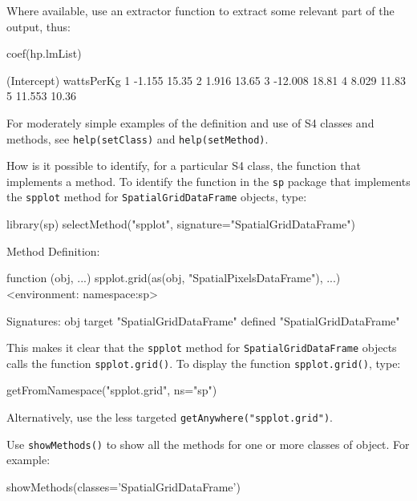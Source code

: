 \documentclass{tufte-book}\usepackage[]{graphicx}\usepackage[]{color}
\newcommand{\txtt}[1]{\texttt{#1}}
\begin{document}
Where available, use an extractor function to extract some relevant
part of the output, thus:
\begin{Schunk}
\begin{Sinput}
coef(hp.lmList)
\end{Sinput}
\begin{Soutput}
  (Intercept) wattsPerKg
1      -1.155      15.35
2       1.916      13.65
3     -12.008      18.81
4       8.029      11.83
5      11.553      10.36
\end{Soutput}
\end{Schunk}

For moderately simple examples of the definition and use of S4 classes
and methods, see \txtt{help(setClass)} and \txtt{help(setMethod)}.

How is it possible to identify, for a particular S4 class, the
function that implements a method.  To identify the function
in the \txtt{sp} package that implements the \txtt{spplot} method
for \txtt{SpatialGridDataFrame} objects, type:
\begin{Schunk}
\begin{Sinput}
library(sp)
selectMethod("spplot",
             signature="SpatialGridDataFrame")
\end{Sinput}
\begin{Soutput}
Method Definition:

function (obj, ...) 
spplot.grid(as(obj, "SpatialPixelsDataFrame"), ...)
<environment: namespace:sp>

Signatures:
        obj                   
target  "SpatialGridDataFrame"
defined "SpatialGridDataFrame"
\end{Soutput}
\end{Schunk}
This makes it clear that the \txtt{spplot} method for
\txtt{SpatialGridDataFrame} objects calls the function
\txtt{spplot.grid()}. To display the function \txtt{spplot.grid()},
type:
\begin{Schunk}
\begin{Sinput}
getFromNamespace("spplot.grid", ns="sp")
\end{Sinput}
\end{Schunk}
\noindent
Alternatively, use the less targeted
\txtt{getAnywhere("spplot.grid")}.

Use \txtt{showMethods()} to show all the methods for one or more
classes of object.  For example:
\begin{Schunk}
\begin{Sinput}
showMethods(classes='SpatialGridDataFrame')
\end{Sinput}
\end{Schunk}
\end{document}

